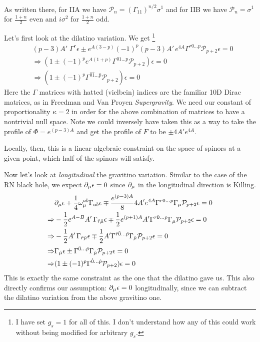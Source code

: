 \documentclass[11pt, class=article, crop=false]{standalone}
\begin{document}
\begin{enumerate}
	 As written there, for IIA we have $\mathcal P_n = (\Gamma_{11})^{n/2} \sigma^1$ and for IIB we have $\mathcal P_n = \sigma^1$ for $\frac{1+n}{2}$ even and $i \sigma^2$ for $\frac{1+n}{2}$ odd. 
	
	Let's first look at the dilatino variation. We get \footnote{I have set $g_s = 1$ for all of this. I don't understand how any of this could work without being modified for arbitrary $g_s$.}
	\[
	\begin{aligned}
		&(p-3) A' \; \Gamma^r \epsilon \pm e^{A(3-p)} (-1)^{p} (p-3) A'\, e^{4A} \Gamma^{r 0 \dots p} \mathcal P_{p+2} \epsilon = 0\\
		& \Rightarrow (1 \pm (-1)^{p} e^{A (1 + p)} \Gamma^{0 1 \dots p} \mathcal P_{p+2}) \epsilon = 0\\
		& \Rightarrow (1 \pm  (-1)^{p} \Gamma^{\hat 0 \hat 1 \dots \hat p} \mathcal P_{p+2}) \epsilon = 0
	\end{aligned}
	\]
	Here the $\Gamma$ matrices with hatted (vielbein) indices are the familiar 10D Dirac matrices, as in Freedman and Van Proyen \emph{Supergravity}. We need our constant of proportionality $\kappa=2$ in order for the above combination of matrices to have a nontrivial null space. Note we could inversely have taken this as a way to take the profile of $\Phi = e^{(p-3) A}$ and get the profile of $F$ to be  $\pm 4 A' e^{4A}$.

	Locally, then, this is a linear algebraic constraint on the space of spinors at a given point, which half of the spinors will satisfy. 
	
	Now let's look at \emph{longitudinal} the gravitino variation. Similar to the case of the RN black hole, we expect $\partial_\mu \epsilon = 0$ since $\partial_\mu$ in the longitudinal direction is Killing.
	\[
	\begin{aligned}
		& \partial_\mu \epsilon + \frac14 \omega_\mu^{ab} \Gamma_{ab} \epsilon \mp \frac{e^{(p-3)A}}{8} 4 A' e^{4 A} \Gamma^{r 0 \dots p} \Gamma_\mu \mathcal P_{p+2} \epsilon = 0 \\
		\Rightarrow & - \frac12 e^{A-B} A' \, \Gamma_{\hat r \hat \mu} \epsilon \mp \frac12 e^{(p+1)A} A' \Gamma^{r 0 \dots p} \Gamma_\mu \mathcal P_{p+2} \epsilon = 0\\
		\Rightarrow & - \frac12 A' \, \Gamma_{\hat r \hat \mu} \epsilon \mp \frac12 A' \Gamma^{\hat r \hat 0 \dots \hat p} \Gamma_{\hat \mu} \mathcal P_{p+2} \epsilon = 0\\
		\Rightarrow & \Gamma_{\hat \mu} \epsilon \pm \Gamma^{\hat 0 \dots \hat p} \Gamma_{\hat \mu} \mathcal P_{p+2} \epsilon = 0\\
		\Rightarrow & (1 \pm (-1)^p \Gamma^{\hat 0 \dots \hat p} \mathcal P_{p+2}) \epsilon = 0
	\end{aligned}
	\]
	This is exactly the same constraint as the one that the dilatino gave us. This also directly confirms our assumption: $\partial_\mu \epsilon = 0$ longitudinally, since we can subtract the dilatino variation from the above gravitino one. 
	

\end{enumerate}
\end{document}

